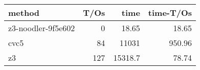 \begin{tabular}{lrrr}
\hline
 method             &   T/Os &     time &   time-T/Os \\
\hline
 z3-noodler-9f5e602 &      0 &    18.65 &       18.65 \\
 cvc5               &     84 & 11031    &      950.96 \\
 z3                 &    127 & 15318.7  &       78.74 \\
\hline
\end{tabular}
